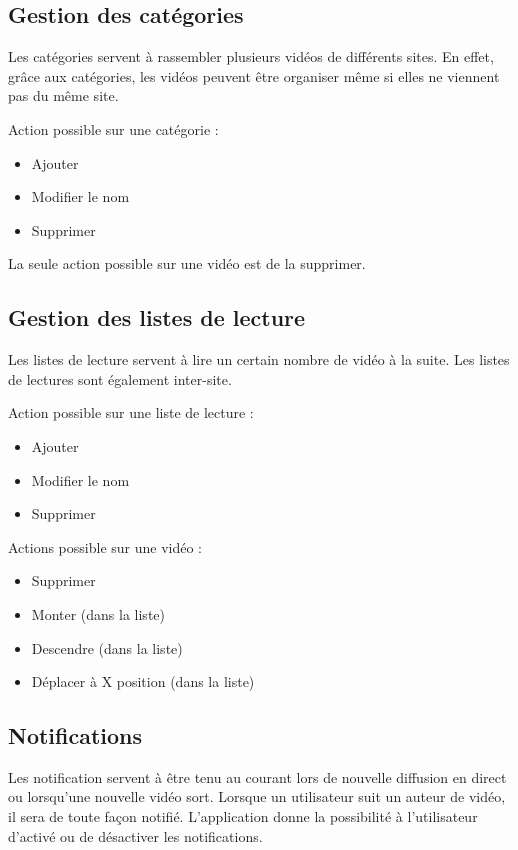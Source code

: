 \documentclass[11pt]{report} %
\begin{document}
		\subsection{Gestion des catégories}
		Les catégories servent à rassembler plusieurs vidéos de différents sites. En effet, grâce aux catégories, les vidéos peuvent être organiser même si elles ne viennent pas du même site.
		
		Action possible sur une catégorie :
		\begin{itemize}
			\item Ajouter
			\item Modifier le nom
			\item Supprimer
		\end{itemize}
		
		La seule action possible sur une vidéo est de la supprimer.
		
		\subsection{Gestion des listes de lecture}
		Les listes de lecture servent à lire un certain nombre de vidéo à la suite. Les listes de lectures sont également inter-site.
		
		Action possible sur une liste de lecture :
		\begin{itemize}
			\item Ajouter
			\item Modifier le nom
			\item Supprimer
		\end{itemize}
		
		Actions possible sur une vidéo :
		\begin{itemize}
			\item Supprimer
			\item Monter (dans la liste)
			\item Descendre (dans la liste)
			\item Déplacer à X position (dans la liste)
		\end{itemize}
		
		\subsection{Notifications}
		Les notification servent à être tenu au courant lors de nouvelle diffusion en direct ou lorsqu'une nouvelle vidéo sort.
		Lorsque un utilisateur suit un auteur de vidéo, il sera de toute façon notifié.
		L'application donne la possibilité à l'utilisateur d'activé ou de désactiver les notifications.
		
\end{document}
